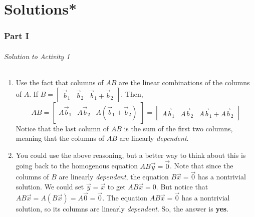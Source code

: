 \part{Solutions*}

\section{Part I}
\paragraph{Solution to Activity 1}
\begin{enumerate}
	\item Use the fact that columns of \(AB\) are the linear combinations of the columns of \(A\). If 
		\(B = \begin{bmatrix}\vec{b}_1 & \vec{b}_2 & \vec{b}_1 + \vec{b}_2\end{bmatrix}\). Then, 
		\[AB = \begin{bmatrix}A\vec{b}_1 & A\vec{b}_2 & A(\vec{b}_1 + \vec{b}_2)\end{bmatrix} 
		       = \begin{bmatrix}A\vec{b}_1 & A\vec{b}_2 & A\vec{b}_1 + A\vec{b}_2\end{bmatrix}\]
		Notice that the last column of \(AB\) is the sum of the first two columns, meaning that the columns of \(AB\) are linearly \emph{dependent}.
	\item You could use the above reasoning, but a better way to think about this is going back to the homogenous equation \(AB\vec{y} = \vec{0}\). Note that 
		since the columns of \(B\) are linearly \emph{dependent}, the equation \(B\vec{x} = \vec{0}\) has a nontrivial solution. We could set 
		\(\vec{y} = \vec{x}\) to get \(AB\vec{x} = 0\). But notice that \(AB\vec{x} = A(B\vec{x}) = A\vec{0} = \vec{0}.\) The equation \(AB\vec{x} = \vec{0}\)
		has a nontrivial solution, so its columns are linearly \emph{dependent}. So, the answer is \textbf{yes}.
\end{enumerate}

